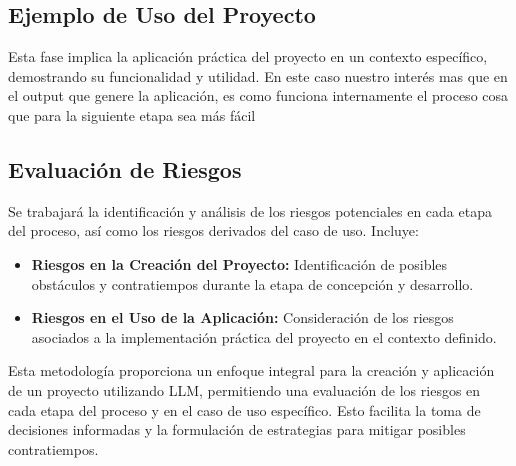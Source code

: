 \subsection{Ejemplo de Uso del Proyecto}

Esta fase implica la aplicación práctica del proyecto en un contexto específico, demostrando su funcionalidad y utilidad. 
En este caso nuestro interés mas que en el output que genere la aplicación, es como funciona internamente el proceso cosa 
que para la siguiente etapa sea más fácil 

\subsection{Evaluación de Riesgos}

Se trabajará la identificación y análisis de los riesgos potenciales en cada etapa del proceso, así como los riesgos derivados
del caso de uso. Incluye:

\begin{itemize}
    \item \textbf{Riesgos en la Creación del Proyecto:} Identificación de posibles obstáculos y contratiempos durante la etapa de concepción y desarrollo.
    \item \textbf{Riesgos en el Uso de la Aplicación:} Consideración de los riesgos asociados a la implementación práctica del proyecto en el contexto definido.
\end{itemize}

Esta metodología proporciona un enfoque integral para la creación y aplicación de un proyecto utilizando LLM, permitiendo una evaluación de los riesgos en cada etapa del proceso y en el caso de uso específico. Esto facilita la toma de decisiones informadas y la formulación de estrategias para mitigar posibles contratiempos.










